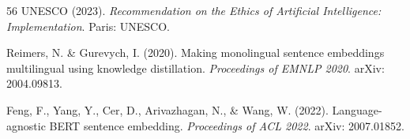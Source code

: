 \documentclass[11pt,a4paper]{article}
\begin{document}
\begin{thebibliography}{56}
{UNESCO} (2023).
\newblock \emph{Recommendation on the Ethics of Artificial Intelligence: Implementation}.
\newblock Paris: UNESCO.

Reimers, N. \& Gurevych, I. (2020).
\newblock Making monolingual sentence embeddings multilingual using knowledge distillation.
\newblock \emph{Proceedings of EMNLP 2020}.
\newblock arXiv: 2004.09813.

Feng, F., Yang, Y., Cer, D., Arivazhagan, N., \& Wang, W. (2022).
\newblock Language-agnostic {BERT} sentence embedding.
\newblock \emph{Proceedings of ACL 2022}.
\newblock arXiv: 2007.01852.

\end{thebibliography}
\end{document}
